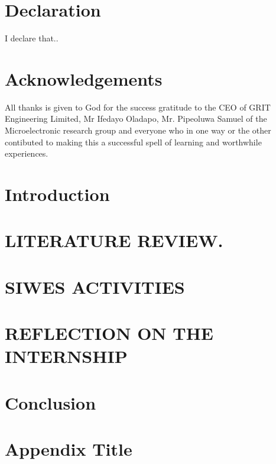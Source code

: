 \documentclass[12pt,twoside]{report}
\begin{document}
\chapter*{Declaration}
I declare that..
 
\chapter*{Acknowledgements}
All thanks is given to God for the success gratitude to the CEO of GRIT Engineering Limited, Mr Ifedayo Oladapo, Mr. Pipeoluwa Samuel of the Microelectronic research group and everyone who in one way or the other contibuted to making this a successful spell of learning and worthwhile experiences.

 
\tableofcontents




\chapter{Introduction}

 
\chapter{LITERATURE REVIEW.}

 
\chapter{SIWES ACTIVITIES}

 
\chapter{REFLECTION ON THE INTERNSHIP}

 
\chapter{Conclusion}


\appendix
\chapter{Appendix Title}

\end{document}
